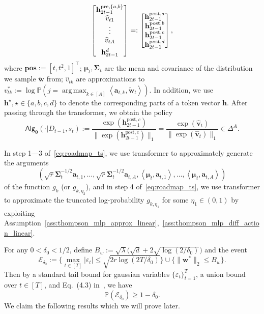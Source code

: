 \documentclass[10pt]{article}
\renewcommand{\hat}{\widehat}
\newcommand{\eps}{\varepsilon}
\DeclareMathOperator*{\argmax}{arg\,max}
\newcommand{\<}{\left\langle}
\renewcommand{\>}{\right\rangle}
\renewcommand{\P}{\mathbb{P}}
\newcommand{\pre}{{\mathrm{pre}}}
\newcommand{\posv}{{\mathbf{pos}}}
\newcommand{\post}{{\mathrm{post}}}
\newcommand{\parta}{{a}}
\newcommand{\partb}{{b}}
\newcommand{\partc}{{c}}
\newcommand{\partd}{{d}}
\newcommand{\Tpsmean}{{{\mathbf\mu}}}
\newcommand{\Tpscov}{{{\mathbf\Sigma}}}
\newcommand{\Tpssam}{{\tilde\bw}}
\newcommand{\Tpsparn}{{r}}
\newcommand{\trunprob}{{\eta_1}}
\newcommand{\hpevent}{{\mathcal E}}
\newcommand{\Trunregpa}{{\eta_2}}
\newcommand{\state}{{s}}
\newcommand{\totlen}{{T}}
\newcommand{\sAlg}{{\mathsf{Alg}}}
\newcommand{\dset}{{D}}
\newcommand{\tfpar}{{\btheta}}
\def\btheta{{\boldsymbol \theta}}
\def\ba{{\mathbf a}}
\def\bh{{\mathbf h}}
\def\bv{{\mathbf v}}
\def\bw{{\mathbf w}}
\begin{document}
\begin{align}
\begin{bmatrix}
    \bh_{2t-1}^{\pre,\{\parta,\partb\}}\\ \hat v_{t1}\\\vdots\\ \hat{v}_{tA} \vspace{0.5em}\\ \bh_{2t-1}^{\partd}
\end{bmatrix}
=:
\begin{bmatrix}
    \bh_{2t-1}^{\post,\parta} \\  \bh_{2t-1}^{\post,\partb}\\  \bh_{2t-1}^{\post,\partc}\\   \bh_{2t-1}^{\post,\partd}
\end{bmatrix},\notag
\end{align}
where $\posv:=[t,t^2,1]^\top$; $\Tpsmean_t,\Tpscov_t$ are the mean and covariance of the distribution we sample $\tilde\bw$ from; $\hat v_{tk}$ are approximations to $v^*_{tk}:=\log \P(j=\argmax_{k\in[A]}\<\ba_{t,k},\Tpssam_t\>)$. In addition, we use $\bh^\star,\star\in\{\parta,\partb,\partc,\partd\}$ to denote the corresponding parts of a token vector $\bh$. After passing through the transformer, we obtain the policy
$$
\sAlg_\tfpar(\cdot|\dset_{t-1},\state_t):=\frac{\exp(\bh^{\post,\partc}_{2t-1})}{\|\exp(\bh^{\post,\partc}_{2t-1})\|_1}=\frac{\exp(\hat \bv_t)}{\|\exp(\hat \bv_t)\|_1}\in\Delta^A.
$$

In step 1---3 of~\eqref{eq:roadmap_ts},  we use transformer to approximately generate the arguments $$(\sqrt{\Tpsparn}\Tpscov_t^{-1/2}\ba_{t,1},\ldots,\sqrt{\Tpsparn}\Tpscov_t^{-1/2}\ba_{t,A},\<\Tpsmean_t,\ba_{t,1}\>,\ldots,\<\Tpsmean_t,\ba_{t,A}\>)$$ of the function $g_k$ (or $g_{k,\Trunregpa}$), and in step 4 of~\eqref{eq:roadmap_ts}, we use transformer to approximate the truncated log-probability $g_{k,\trunprob}$ for some $\trunprob\in(0,1)$ by exploiting Assumption~\ref{ass:thompson_mlp_approx_linear},~\ref{ass:thompson_mlp_diff_action_linear}.

For any $0<\delta_0<1/2$, define $B_w:=\sqrt{\lambda}\big(\sqrt{d}+2\sqrt{\log(2/\delta_0)}\big)$ and the event $$\hpevent_{\delta_0}:=\{\max_{t\in[T]}|\eps_t|\leq\sqrt{2\Tpsparn\log(2T/\delta_0)}\}\cup \{\|\bw^*\|_2\leq  B_w\}.$$ Then by  a standard tail bound for gaussian variables $\{\eps_t\}_{t=1}^\totlen$,  a union bound over $t\in[T]$, and Eq.~(4.3) in~\cite{laurent2000adaptive}, we have $$\P(\hpevent_{\delta_0})\geq 1-{\delta_0}.$$
We claim the following results which we will prove later.
\end{document}
